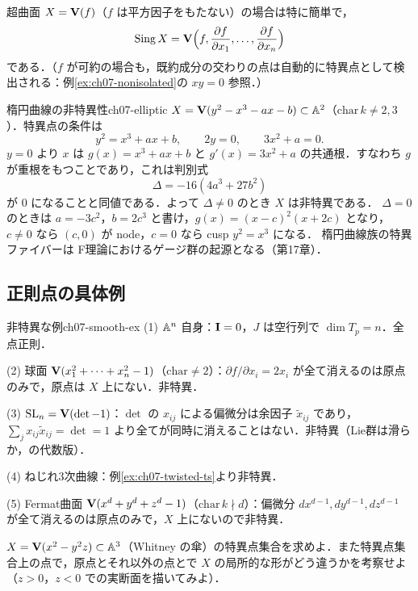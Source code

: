 超曲面 $X=\mathbf{V}(f)$（$f$ は平方因子をもたない）の場合は特に簡単で，
\[
  \operatorname{Sing} X=\mathbf{V}\Bigl(f,\frac{\partial f}{\partial x_1},\dots,\frac{\partial f}{\partial x_n}\Bigr)
\]
である．（$f$ が可約の場合も，既約成分の交わりの点は自動的に特異点として検出される：例\ref{ex:ch07-nonisolated}の $xy=0$ 参照．）

\begin{myex}{楕円曲線の非特異性}{ch07-elliptic}
$X=\mathbf{V}(y^2-x^3-ax-b)\subset\mathbb{A}^2$（$\mathrm{char}\,k\neq2,3$）．特異点の条件は
\[
  y^2=x^3+ax+b,\qquad 2y=0,\qquad 3x^2+a=0.
\]
$y=0$ より $x$ は $g(x)=x^3+ax+b$ と $g'(x)=3x^2+a$ の共通根．すなわち $g$ が重根をもつことであり，これは判別式
\[
  \Delta=-16(4a^3+27b^2)
\]
が $0$ になることと同値である．よって $\Delta\neq0$ のとき $X$ は非特異である．
$\Delta=0$ のときは $a=-3c^2$，$b=2c^3$ と書け，$g(x)=(x-c)^2(x+2c)$ となり，$c\ne0$ なら $(c,0)$ が node，$c=0$ なら cusp $y^2=x^3$ になる．
楕円曲線族の特異ファイバーは F理論におけるゲージ群の起源となる（第17章）．
\end{myex}

\subsection{正則点の具体例}

\begin{myex}{非特異な例}{ch07-smooth-ex}
(1) $\mathbb{A}^n$ 自身：$\mathbf{I}=0$，$J$ は空行列で $\dim T_p=n$．全点正則．

(2) 球面 $\mathbf{V}(x_1^2+\cdots+x_n^2-1)$（$\mathrm{char}\ne2$）：$\partial f/\partial x_i=2x_i$ が全て消えるのは原点のみで，原点は $X$ 上にない．非特異．

(3) $\operatorname{SL}_n=\mathbf{V}(\det-1)$：$\det$ の $x_{ij}$ による偏微分は余因子 $\tilde x_{ij}$ であり，$\sum_j x_{ij}\tilde x_{ij}=\det=1$ より全てが同時に消えることはない．非特異（Lie群は滑らか，の代数版）．

(4) ねじれ3次曲線：例\ref{ex:ch07-twisted-ts}より非特異．

(5) Fermat曲面 $\mathbf{V}(x^d+y^d+z^d-1)$（$\mathrm{char}\,k\nmid d$）：偏微分 $dx^{d-1},dy^{d-1},dz^{d-1}$ が全て消えるのは原点のみで，$X$ 上にないので非特異．
\end{myex}

$X=\mathbf{V}(x^2-y^2z)\subset\mathbb{A}^3$（Whitney の傘）の特異点集合を求めよ．また特異点集合上の点で，原点とそれ以外の点とで $X$ の局所的な形がどう違うかを考察せよ（$z>0$，$z<0$ での実断面を描いてみよ）．

